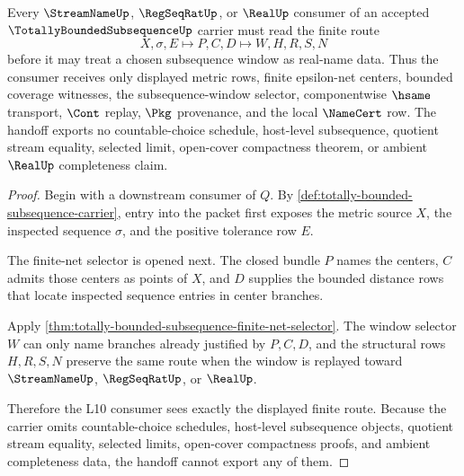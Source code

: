 \begin{theorem}
\label{thm:totally-bounded-subsequence-l10-handoff}
Every $\StreamNameUp$, $\RegSeqRatUp$, or $\RealUp$ consumer of an accepted $\TotallyBoundedSubsequenceUp$ carrier must read the finite route
$$
X,\sigma,E \longmapsto P,C,D \longmapsto W,H,R,S,N
$$
before it may treat a chosen subsequence window as real-name data. Thus the consumer receives only displayed metric rows, finite epsilon-net centers, bounded coverage witnesses, the subsequence-window selector, componentwise $\hsame$ transport, $\Cont$ replay, $\Pkg$ provenance, and the local $\NameCert$ row. The handoff exports no countable-choice schedule, host-level subsequence, quotient stream equality, selected limit, open-cover compactness theorem, or ambient $\RealUp$ completeness claim.
\end{theorem}
\begin{proof}
Begin with a downstream consumer of $Q$. By \autoref{def:totally-bounded-subsequence-carrier}, entry into the packet first exposes the metric source $X$, the inspected sequence $\sigma$, and the positive tolerance row $E$.

The finite-net selector is opened next. The closed bundle $P$ names the centers, $C$ admits those centers as points of $X$, and $D$ supplies the bounded distance rows that locate inspected sequence entries in center branches.

Apply \autoref{thm:totally-bounded-subsequence-finite-net-selector}. The window selector $W$ can only name branches already justified by $P,C,D$, and the structural rows $H,R,S,N$ preserve the same route when the window is replayed toward $\StreamNameUp$, $\RegSeqRatUp$, or $\RealUp$.

Therefore the L10 consumer sees exactly the displayed finite route. Because the carrier omits countable-choice schedules, host-level subsequence objects, quotient stream equality, selected limits, open-cover compactness proofs, and ambient completeness data, the handoff cannot export any of them.
\end{proof}


